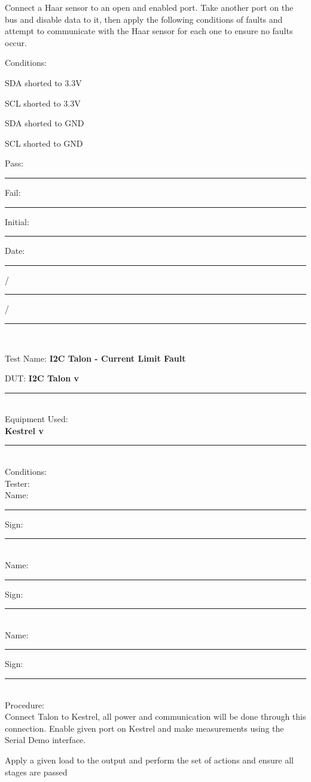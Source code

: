 Connect a Haar sensor to an open and enabled port. Take another port on the bus and disable data to it, then apply the following conditions of faults and attempt to communicate with the Haar sensor for each one to ensure no faults occur. 

{\large Conditions: }
\begin{description}
\item SDA shorted to 3.3V
\item SCL shorted to 3.3V
\item SDA shorted to GND
\item SCL shorted to GND
\end{description}


\vfill
{\large Pass: \rule{1cm}{0.15mm} \hspace{1cm} Fail: \rule{1cm}{0.15mm}} \hfill Initial: \rule{2cm}{0.15mm} \hspace{1cm} Date: \rule{0.5cm}{0.15mm}/\rule{0.5cm}{0.15mm}/\rule{1cm}{0.15mm}\\[5pt]

\pagebreak

{\Huge Test Name: \textbf{I2C Talon - Current Limit Fault}}\\[20pt]
{\Large DUT: \textbf{I2C Talon v}\rule{1cm}{0.15mm}} \\[10pt]
{\Large Equipment Used: }\\[5pt]
\textbf{Kestrel v}\rule{1cm}{0.15mm}\\[40pt]
{\Large Conditions: }\\[40pt]
{\Large Tester: }\\[10pt]
Name: \rule{4cm}{0.15mm} \hfill Sign: \rule{4cm}{0.15mm}\\[5pt]
Name: \rule{4cm}{0.15mm} \hfill Sign: \rule{4cm}{0.15mm}\\[5pt]
Name: \rule{4cm}{0.15mm} \hfill Sign: \rule{4cm}{0.15mm}\\[15pt]
{\Large Procedure: }\\
Connect Talon to Kestrel, all power and communication will be done through this connection. Enable given port on Kestrel and make measurements using the Serial Demo interface. 

Apply a given load to the output and perform the set of actions and ensure all stages are passed 

